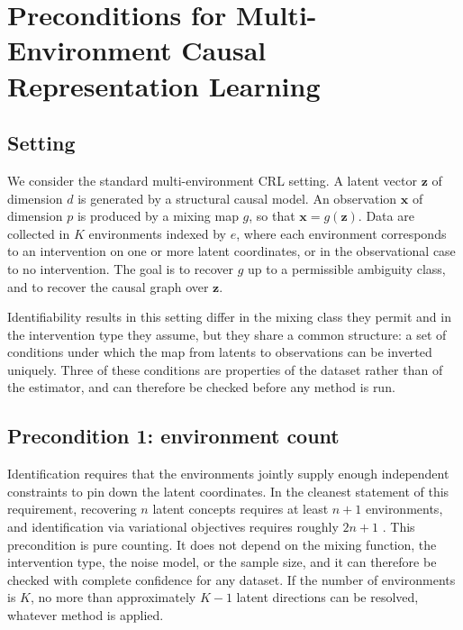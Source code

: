 \documentclass[journal,twoside,web]{ieeecolor}
\begin{document}
\section{Preconditions for Multi-Environment Causal Representation Learning}
\label{sec:precond}

\subsection{Setting}
We consider the standard multi-environment CRL setting. A latent vector
$\mathbf{z}$ of dimension $d$ is generated by a structural causal model. An
observation $\mathbf{x}$ of dimension $p$ is produced by a mixing map $g$, so
that $\mathbf{x} = g(\mathbf{z})$. Data are collected in $K$ environments
indexed by $e$, where each environment corresponds to an intervention on one
or more latent coordinates, or in the observational case to no intervention.
The goal is to recover $g$ up to a permissible ambiguity class, and to recover
the causal graph over $\mathbf{z}$.

Identifiability results in this setting differ in the mixing class they permit
and in the intervention type they assume, but they share a common structure: a
set of conditions under which the map from latents to observations can be
inverted uniquely. Three of these conditions are properties of the dataset
rather than of the estimator, and can therefore be checked before any method
is run.

\subsection{Precondition 1: environment count}
Identification requires that the environments jointly supply enough
independent constraints to pin down the latent coordinates. In the cleanest
statement of this requirement, recovering $n$ latent concepts requires at
least $n+1$ environments, and identification via variational objectives
requires roughly $2n+1$ \cite{rajendran2024}. This precondition is pure
counting. It does not depend on the mixing function, the intervention type,
the noise model, or the sample size, and it can therefore be checked with
complete confidence for any dataset. If the number of environments is $K$, no
more than approximately $K-1$ latent directions can be resolved, whatever
method is applied.
\end{document}
